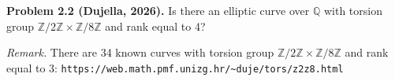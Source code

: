 \textbf{Problem 2.2 (Dujella, 2026).} Is there an elliptic curve over $\mathbb{Q}$ with torsion group $\mathbb{Z}/2\mathbb{Z}\times\mathbb{Z}/8\mathbb{Z}$ and rank equal to 4?

\medskip

\textit{Remark.} There are 34 known curves with torsion group $\mathbb{Z}/2\mathbb{Z}\times\mathbb{Z}/8\mathbb{Z}$ and rank equal to 3: \texttt{https://web.math.pmf.unizg.hr/\textasciitilde duje/tors/z2z8.html}
